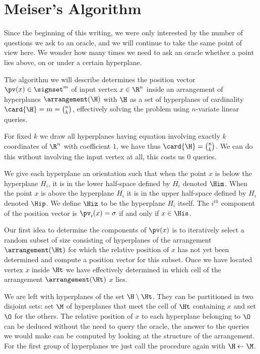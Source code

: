 \section{Meiser's Algorithm}


Since the beginning of this writing, we were only interested by the number of
questions we ask to an oracle, and we will continue to take the same point of
view here. We wonder how many times we need to ask an oracle whether a point
lies above, on or under a certain hyperplane.

The algorithm we will describe determines the position vector $\pv(x) \in
\signset^{m}$ of input vertex $x \in \R^n$ inside an
arrangement of hyperplanes $\arrangement(\H)$ with $\H$ as a set of hyperplanes
of cardinality $\card{\H} = m = \binom{n}{k}$,
effectively solving the \kSUM problem using  $n$-variate
linear queries.

For fixed $k$ we draw all hyperplanes having equation involving exactly $k$
coordinates of $\R^n$ with coefficient $1$, we have thus $\card{\H} =
\binom{n}{k}$. We can do this without involving the input vertex at all, this
costs us $0$ queries.

We give each hyperplane an orientation such that when the point $x$ is below
the
hyperplane $H_i$, it is in the lower half-space defined by $H_i$ denoted
$\Him$. When the point $x$ is above the hyperplane $H_i$ it is in the upper
half-space defined by $H_i$ denoted $\Hip$. We define $\Hiz$ to be the
hyperplane $H_i$ itself. The $i^{th}$ component of the position vector is
$\pv_i(x) = \sigma$ if and only if $x \in \His$.

Our first idea to determine the components of $\pv(x)$ is to iteratively
select a random subset of size  consisting of hyperplanes of the
arrangement $\arrangement(\Ht)$ for which the relative position of $x$ has not yet been
determined and compute a position vector for this subset. Once we have located
vertex $x$ inside $\Ht$ we have effectively determined in
which cell of the arrangement $\arrangement(\Ht)$ $x$ lies.

We are left with hyperplanes of the set $\H \setminus \Ht$. They can be
partitioned in two disjoint sets: set $\M$ of hyperplanes that meet the cell of
$\Ht$ containing $x$ and set $\O$ for the others. The relative position of $x$
to each hyperplane belonging to $\O$ can be deduced without the need to query
the oracle, the answer to the queries we would make can be computed by looking
at the structure of the arrangement. For the first group of hyperplanes
we just call the procedure again with $\H \gets \M$.

